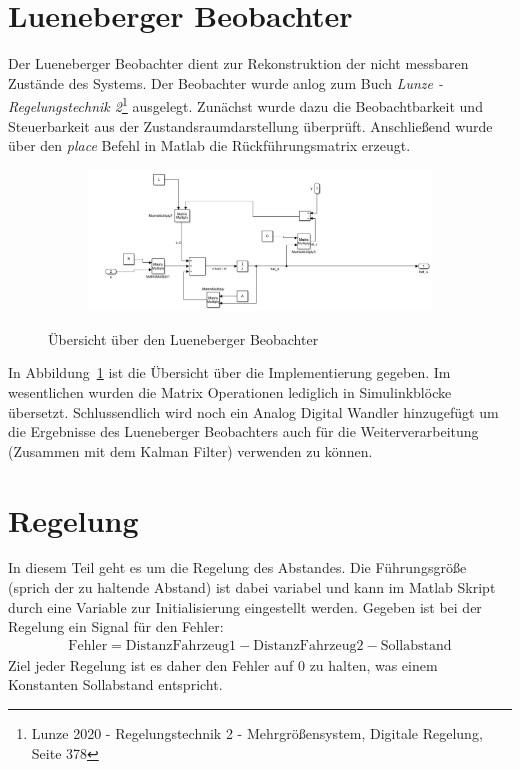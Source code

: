 \section{Lueneberger Beobachter}\label{sec:Lueneberger Beobachter}
Der Lueneberger Beobachter dient zur Rekonstruktion der nicht messbaren Zustände
des Systems. Der Beobachter wurde anlog zum Buch \textit{Lunze - Regelungstechnik
2}\footnote{Lunze 2020 - Regelungstechnik 2 - Mehrgrößensystem, Digitale Regelung,
Seite 378} ausgelegt. Zunächst wurde dazu die Beobachtbarkeit und Steuerbarkeit
aus der Zustandsraumdarstellung überprüft. Anschließend wurde über den
\textit{place} Befehl in Matlab die Rückführungsmatrix erzeugt.
\begin{figure}[hbt]
\centering
\begin{subfigure}{0.6\textwidth}
    \centering
    \includegraphics*[width=\textwidth]{figures/lueneberger.png}
\end{subfigure}
    \caption{Übersicht über den Lueneberger Beobachter
    \label{fig:lueneberger}}
\end{figure}    
In Abbildung~\ref{fig:lueneberger} ist die Übersicht über die Implementierung
gegeben. Im wesentlichen wurden die Matrix Operationen lediglich in
Simulinkblöcke übersetzt. Schlussendlich wird noch ein Analog Digital Wandler
hinzugefügt um die Ergebnisse des Lueneberger Beobachters auch für die
Weiterverarbeitung (Zusammen mit dem Kalman Filter) verwenden zu können.

\section{Regelung}\label{sec:Regelung}
In diesem Teil geht es um die Regelung des Abstandes. Die Führungsgröße (sprich
der zu haltende Abstand) ist dabei variabel und kann im Matlab Skript durch eine
Variable zur Initialisierung eingestellt werden. Gegeben ist bei der Regelung
ein Signal für den Fehler:
\begin{align*}
    \mathrm{Fehler} = \mathrm{Distanz Fahrzeug 1} - \mathrm{Distanz Fahrzeug 2} - \mathrm{Sollabstand}
\end{align*}
Ziel jeder Regelung ist es daher den Fehler auf 0 zu halten, was einem
Konstanten Sollabstand entspricht.


